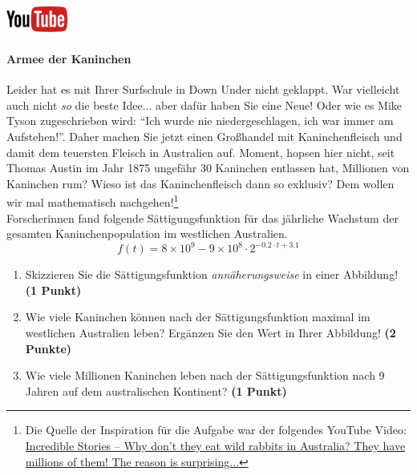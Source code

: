 \documentclass[a4paper, 9pt]{scrartcl}\usepackage[]{graphicx}\usepackage[]{xcolor}
\begin{document}
\hfill\href{https://youtu.be/Mr6eslls4J0}{\includegraphics[width =
  2cm]{img/youtube}} %
\hspace{2Ex}

\paragraph{Armee der Kaninchen}



Leider hat es mit Ihrer Surfschule in Down Under nicht geklappt. War vielleicht
auch nicht \textit{so} die beste Idee... aber daf{\"u}r haben Sie eine Neue!
Oder wie es Mike Tyson zugeschrieben wird: "`Ich wurde nie
niedergeschlagen, ich war immer am Aufstehen!"'. Daher machen Sie jetzt
einen Gro{\ss}handel mit Kaninchenfleisch und damit dem teuersten Fleisch in
Australien auf. Moment, hopsen hier nicht, seit Thomas Austin im Jahr
1875 ungef{\"a}hr 30 Kaninchen entlassen hat,
Millionen von Kaninchen rum? Wieso ist das Kaninchenfleisch dann so
exklusiv? Dem wollen wir mal mathematisch nachgehen!\footnote{Die Quelle
  der Inspiration f{\"u}r die Aufgabe war der folgendes YouTube Video:
  \href{https://youtu.be/38fuOr3tdgc?si=Li7NL_FoByML8JtT}{ Incredible
    Stories -- Why don't they eat wild rabbits in Australia? They have
    millions of them! The reason is surprising...}}
\\

Forscherinnen fand folgende S{\"a}ttigungsfunktion f{\"u}r das j{\"a}hrliche Wachstum
der gesamten Kaninchenpopulation im westlichen Australien.
\begin{equation*}
  f(t) = \ensuremath{8\times 10^{9}} - \ensuremath{9\times 10^{8}} \cdot 2^{-0.2 \cdot t + 3.1}
\end{equation*}

\begin{enumerate}
\item Skizzieren Sie die S{\"a}ttigungsfunktion \textit{ann{\"a}herungsweise} in einer Abbildung! \textbf{(1
    Punkt)}
\item Wie viele Kaninchen k{\"o}nnen nach der S{\"a}ttigungsfunktion maximal im
  westlichen Australien leben? Erg{\"a}nzen Sie den Wert in Ihrer Abbildung! \textbf{(2 Punkte)}
\item Wie viele Millionen Kaninchen leben nach der S{\"a}ttigungsfunktion
  nach 9 Jahren auf dem australischen Kontinent? \textbf{(1
    Punkt)}
\end{enumerate}
\end{document}

